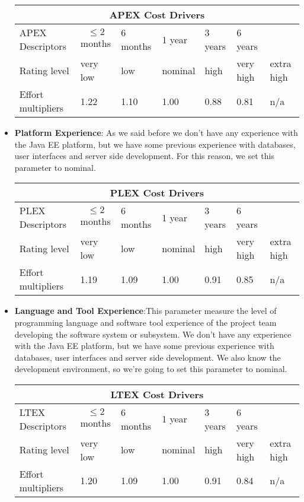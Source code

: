 \begin{itemize}
\begin{longtable}{| m{}| m{} | m{} | m{} | m{} | m{} | m{}| }
\hline
\multicolumn{7}{c}{APEX Cost Drivers}\\
\hline
\hline
APEX Descriptors & \begin{equation*}
{\le 2}
\end{equation*} months  & 6 months & 1 year & 3 years & 6 years & \\
\hline
Rating level & very low & low & nominal & high & very high & extra high \\
\hline
Effort multipliers & 1.22 & 1.10 & 1.00 & 0.88 & 0.81 & n/a \\
\hline
\end{longtable}

\item \textbf{Platform Experience}:
As we said before we don’t have any experience with the Java EE platform, but
we have some previous experience with databases, user interfaces
and server side development. For this reason, we set
this parameter to nominal.

\begin{longtable}{| m{}| m{} | m{} | m{} | m{} | m{} | m{}| }
\hline
\multicolumn{7}{c}{PLEX Cost Drivers}\\
\hline
\hline
PLEX Descriptors & \begin{equation*}
{\le 2}
\end{equation*} months  & 6 months & 1 year & 3 years & 6 years & \\
\hline
Rating level & very low & low & nominal & high & very high & extra high \\
\hline
Effort multipliers & 1.19 & 1.09 & 1.00 & 0.91 & 0.85 & n/a \\
\hline
\end{longtable}

\item\textbf{Language and Tool Experience}:This parameter measure the level of programming language and software tool experience of the project team developing the software system or subsystem. We don’t have any experience with the Java EE platform, but we have some previous experience with databases, user interfaces and server side development. We also know the development environment, so we’re going to set this parameter to nominal.

\begin{longtable}{| m{}| m{} | m{} | m{} | m{} | m{} | m{}| }
\hline
\multicolumn{7}{c}{LTEX Cost Drivers}\\
\hline
\hline
LTEX Descriptors & \begin{equation*}
{\le 2}
\end{equation*} months  & 6 months & 1 year & 3 years & 6 years & \\
\hline
Rating level & very low & low & nominal & high & very high & extra high \\
\hline
Effort multipliers & 1.20 & 1.09 & 1.00 & 0.91 & 0.84 & n/a \\
\hline


\end{longtable}
\end{itemize}
